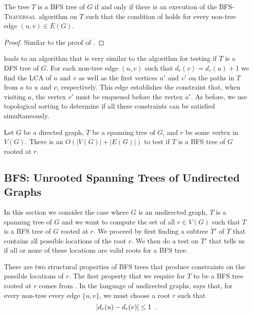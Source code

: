 \documentclass[lotsofwhite]{patmorin}
\newcommand{\bfst}{\textsc{BFS-Traversal}}
\newcommand{\layer}{d}
\begin{document}
\begin{lem}
The tree $T$ is a BFS tree of $G$ if and only if there is an execution
of the \bfst\ algorithm on $T$ such that the condition of
 holds for every non-tree edge $(u,v)\in E(G)$.  
\end{lem}

\begin{proof}
Similar to the proof of .
\end{proof}


 leads to an algorithm that is very similar to
the algorithm for testing if $T$ is a DFS tree of $G$.  For each
non-tree edge $(u,v)$ such that $\layer_r(v)=\layer_r(u)+1$ we find
the LCA of $u$ and $v$ as well as the first vertices $u'$ and $v'$ on
the paths in $T$ from $a$ to $u$ and $v$, respectively.  This edge
establishes the constraint that, when visiting $a$, the vertex $v'$
must be enqueued before the vertex $u'$.  As before, we use
topological sorting to determine if all these constraints can be
satisfied simultaneously.

\begin{thm}
Let $G$ be a directed graph, $T$ be a spanning tree of $G$, and $r$ be
some vertex in $V(G)$. There is an $O(|V(G)|+|E(G)|)$ to test if $T$
is a BFS tree of $G$ rooted at $r$.
\end{thm}


\subsection{BFS: Unrooted Spanning Trees of Undirected Graphs}

In this section we consider the case where $G$ is an undirected graph,
$T$ is a spanning tree of $G$ and we want to compute the set of all
$r\in V(G)$ such that $T$ is a BFS tree of $G$ rooted at $r$.  We
proceed by first finding a subtree $T'$ of $T$ that contains all
possible locations of the root $r$.  We then do a test on $T'$ that
tells us if all or none of these locations are valid roots for a BFS
tree.

There are two structural properties of BFS trees that produce
constraints on the possible locations of $r$.  The first property that
we require for $T$ to be a BFS tree rooted at $r$ comes from
.  In the language of undirected graphs, 
says that, for every non-tree every edge $\{u,v\}$, we must choose a
root $r$ such that
\begin{equation}
	\left|\layer_r(u)-\layer_r(v)\right|\le 1 \enspace . \eqlabel{layers}
\end{equation}
\end{document}
